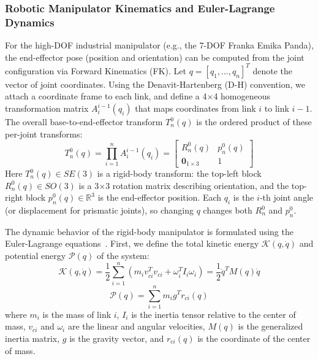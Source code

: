 \subsubsection{Robotic Manipulator Kinematics and Euler-Lagrange Dynamics}
For the high-DOF industrial manipulator (e.g., the 7-DOF Franka Emika Panda), the end-effector pose (position and orientation) can be computed from the joint configuration via Forward Kinematics (FK). Let $q=[q_1,\dots,q_n]^T$ denote the vector of joint coordinates. Using the Denavit-Hartenberg (D-H) convention, we attach a coordinate frame to each link, and define a 4$\times$4 homogeneous transformation matrix $A_i^{i-1}(q_i)$ that maps coordinates from link $i$ to link $i-1$. The overall base-to-end-effector transform $T_n^0(q)$ is the ordered product of these per-joint transforms:
\begin{equation}
    T_n^0(q) = \prod_{i=1}^n A_i^{i-1}(q_i) = \begin{bmatrix} R_n^0(q) & p_n^0(q) \\ \mathbf{0}_{1 \times 3} & 1 \end{bmatrix}
\end{equation}
Here $T_n^0(q) \in SE(3)$ is a rigid-body transform: the top-left block $R_n^0(q) \in SO(3)$ is a 3$\times$3 rotation matrix describing orientation, and the top-right block $p_n^0(q) \in \mathbb{R}^3$ is the end-effector position. Each $q_i$ is the $i$-th joint angle (or displacement for prismatic joints), so changing $q$ changes both $R_n^0$ and $p_n^0$.

The dynamic behavior of the rigid-body manipulator is formulated using the Euler-Lagrange equations~\cite{RMPC}. First, we define the total kinetic energy $\mathcal{K}(q, \dot{q})$ and potential energy $\mathcal{P}(q)$ of the system:
\begin{equation}
    \mathcal{K}(q, \dot{q}) = \frac{1}{2} \sum_{i=1}^n \left( m_i v_{ci}^T v_{ci} + \omega_i^T I_i \omega_i \right) = \frac{1}{2} \dot{q}^T M(q) \dot{q}
\end{equation}
\begin{equation}
    \mathcal{P}(q) = \sum_{i=1}^n m_i g^T r_{ci}(q)
\end{equation}
where $m_i$ is the mass of link $i$, $I_i$ is the inertia tensor relative to the center of mass, $v_{ci}$ and $\omega_i$ are the linear and angular velocities, $M(q)$ is the generalized inertia matrix, $g$ is the gravity vector, and $r_{ci}(q)$ is the coordinate of the center of mass.

